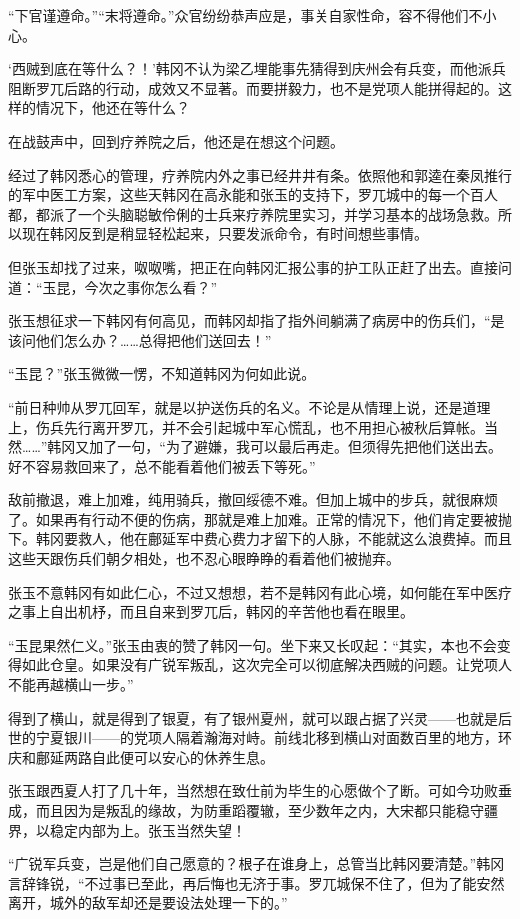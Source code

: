 “下官谨遵命。”“末将遵命。”众官纷纷恭声应是，事关自家性命，容不得他们不小心。

‘西贼到底在等什么？！’韩冈不认为梁乙埋能事先猜得到庆州会有兵变，而他派兵阻断罗兀后路的行动，成效又不显著。而要拼毅力，也不是党项人能拼得起的。这样的情况下，他还在等什么？

在战鼓声中，回到疗养院之后，他还是在想这个问题。

经过了韩冈悉心的管理，疗养院内外之事已经井井有条。依照他和郭逵在秦凤推行的军中医工方案，这些天韩冈在高永能和张玉的支持下，罗兀城中的每一个百人都，都派了一个头脑聪敏伶俐的士兵来疗养院里实习，并学习基本的战场急救。所以现在韩冈反到是稍显轻松起来，只要发派命令，有时间想些事情。

但张玉却找了过来，呶呶嘴，把正在向韩冈汇报公事的护工队正赶了出去。直接问道：“玉昆，今次之事你怎么看？”

张玉想征求一下韩冈有何高见，而韩冈却指了指外间躺满了病房中的伤兵们，“是该问他们怎么办？……总得把他们送回去！”

“玉昆？”张玉微微一愣，不知道韩冈为何如此说。

“前日种帅从罗兀回军，就是以护送伤兵的名义。不论是从情理上说，还是道理上，伤兵先行离开罗兀，并不会引起城中军心慌乱，也不用担心被秋后算帐。当然……”韩冈又加了一句，“为了避嫌，我可以最后再走。但须得先把他们送出去。好不容易救回来了，总不能看着他们被丢下等死。”

敌前撤退，难上加难，纯用骑兵，撤回绥德不难。但加上城中的步兵，就很麻烦了。如果再有行动不便的伤病，那就是难上加难。正常的情况下，他们肯定要被抛下。韩冈要救人，他在鄜延军中费心费力才留下的人脉，不能就这么浪费掉。而且这些天跟伤兵们朝夕相处，也不忍心眼睁睁的看着他们被抛弃。

张玉不意韩冈有如此仁心，不过又想想，若不是韩冈有此心境，如何能在军中医疗之事上自出机杼，而且自来到罗兀后，韩冈的辛苦他也看在眼里。

“玉昆果然仁义。”张玉由衷的赞了韩冈一句。坐下来又长叹起：“其实，本也不会变得如此仓皇。如果没有广锐军叛乱，这次完全可以彻底解决西贼的问题。让党项人不能再越横山一步。”

得到了横山，就是得到了银夏，有了银州夏州，就可以跟占据了兴灵——也就是后世的宁夏银川——的党项人隔着瀚海对峙。前线北移到横山对面数百里的地方，环庆和鄜延两路自此便可以安心的休养生息。

张玉跟西夏人打了几十年，当然想在致仕前为毕生的心愿做个了断。可如今功败垂成，而且因为是叛乱的缘故，为防重蹈覆辙，至少数年之内，大宋都只能稳守疆界，以稳定内部为上。张玉当然失望！

“广锐军兵变，岂是他们自己愿意的？根子在谁身上，总管当比韩冈要清楚。”韩冈言辞锋锐，“不过事已至此，再后悔也无济于事。罗兀城保不住了，但为了能安然离开，城外的敌军却还是要设法处理一下的。”

